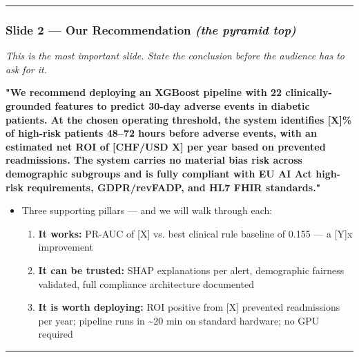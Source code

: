 \documentclass[11pt,a4paper]{article}
\begin{document}
\noindent\rule{\linewidth}{0.4pt}

\subsubsection{Slide 2 --- Our Recommendation \emph{(the pyramid top)}}
\emph{This is the most important slide. State the conclusion before the audience has to ask for it.}

\begin{mdframed}[style=recbox]
\textbf{"We recommend deploying an XGBoost pipeline with 22 clinically-grounded features to predict 30-day adverse events in diabetic patients. At the chosen operating threshold, the system identifies [X]\% of high-risk patients 48--72 hours before adverse events, with an estimated net ROI of [CHF/USD X] per year based on prevented readmissions. The system carries no material bias risk across demographic subgroups and is fully compliant with EU AI Act high-risk requirements, GDPR/revFADP, and HL7 FHIR standards."}
\end{mdframed}

\begin{itemize}
\item Three supporting pillars --- and we will walk through each:
\begin{enumerate}
\item \textbf{It works:} PR-AUC of [X] vs. best clinical rule baseline of 0.155 --- a [Y]x improvement
\item \textbf{It can be trusted:} SHAP explanations per alert, demographic fairness validated, full compliance architecture documented
\item \textbf{It is worth deploying:} ROI positive from [X] prevented readmissions per year; pipeline runs in \textasciitilde{}20 min on standard hardware; no GPU required
\end{enumerate}
\end{itemize}

\noindent\rule{\linewidth}{0.4pt}
\end{document}
